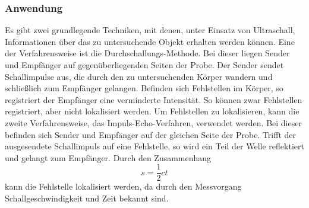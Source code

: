 \subsubsection{Anwendung}
Es gibt zwei grundlegende Techniken, mit denen, unter Einsatz von Ultraschall, Informationen über das zu untersuchende Objekt erhalten werden können.
Eine der Verfahrensweise ist die Durchschallungs-Methode. Bei dieser liegen Sender und Empfänger auf gegenüberliegenden Seiten der Probe.
Der Sender sendet Schallimpulse aus, die durch den zu untersuchenden Körper wandern und schließlich zum Empfänger gelangen.
Befinden sich Fehlstellen im Körper, so registriert der Empfänger eine verminderte Intensität.
So können zwar Fehlstellen registriert, aber nicht lokalisiert werden.
Um Fehlstellen zu lokalisieren, kann die zweite Verfahrensweise, das Impuls-Echo-Verfahren, verwendet werden.
Bei dieser befinden sich Sender und Empfänger auf der gleichen Seite der Probe. Trifft der ausgesendete Schallimpuls auf eine Fehlstelle, so wird ein Teil der Welle reflektiert
und gelangt zum Empfänger. Durch den Zusammenhang
\begin{equation}
s=\frac{1}{2}c t
\end{equation}
kann die Fehlstelle lokalisiert werden, da durch den Messvorgang Schallgeschwindigkeit und Zeit bekannt sind.
